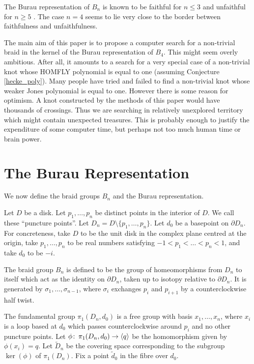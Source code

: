 \documentclass[10pt]{amsart}
\theoremstyle{plain}
\theoremstyle{definition}
\newcommand{\co}{\colon\thinspace}
\begin{document}
The Burau representation of $B_n$
is known to be faithful for $n \le 3$ \cite{birman}
and unfaithful for $n \ge 5$ \cite{bigelow:b5}.
The case $n=4$ seems to lie
very close to the border between faithfulness and unfaithfulness.

The main aim of this paper
is to propose a computer search for 
a non-trivial braid in the kernel of the Burau representation of $B_4$.
This might seem overly ambitious.
After all, it amounts to a search for a very special case of
a non-trivial knot whose HOMFLY polynomial is equal to one 
(assuming Conjecture \ref{hecke_poly}).
Many people have tried and failed
to find a non-trivial knot
whose weaker Jones polynomial is equal to one.
However there is some reason for optimism.
A knot constructed by the methods of this paper
would have thousands of crossings.
Thus we are searching in relatively unexplored territory
which might contain unexpected treasures.
This is probably enough to justify
the expenditure of some computer time,
but perhaps not too much human time or brain power.

\section{The Burau Representation}

We now define the braid groups $B_n$
and the Burau representation.

Let $D$ be a disk.
Let $p_1,\dots,p_n$ be distinct points in the interior of $D$.
We call these ``puncture points''.
Let $D_n = D \setminus \{p_1,\dots,p_n\}$.
Let $d_0$ be a basepoint on $\partial D_n$.
For concreteness,
take $D$ to be the unit disk in the complex plane centred at the origin,
take $p_1,\dots,p_n$ to be real numbers
satisfying $-1 < p_1 < \dots < p_n < 1$,
and take $d_0$ to be $-i$.

The braid group $B_n$ is defined to be
the group of homeomorphisms from $D_n$ to itself
which act as the identity on $\partial D_n$,
taken up to isotopy relative to $\partial D_n$.
It is generated by $\sigma_1,\dots,\sigma_{n-1}$,
where $\sigma_i$ exchanges $p_i$ and $p_{i+1}$
by a counterclockwise half twist.

The fundamental group $\pi_1(D_n,d_0)$ 
is a free group with basis $x_1,\dots,x_n$,
where $x_i$ is a loop based at $d_0$
which passes counterclockwise around $p_i$ 
and no other puncture points.
Let $\phi \co \pi_1(D_n,d_0) \rightarrow \langle q \rangle$
be the homomorphism given by $\phi(x_i) = q$.
Let $\tilde{D}_n$ be the covering space
corresponding to the subgroup $\ker(\phi)$ of $\pi_1(D_n)$.
Fix a point $\tilde{d}_0$ in the fibre over $d_0$.
\end{document}
